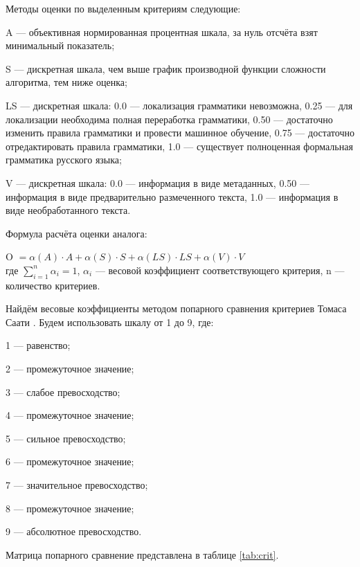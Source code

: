 Методы оценки по выделенным критериям следующие:
\begin{list}{}{\leftmargin=1.5cm}
	\item A --- объективная нормированная процентная шкала, за нуль отсчёта взят минимальный показатель;
	\item S --- дискретная шкала, чем выше график производной функции сложности алгоритма, тем ниже оценка;
	\item LS --- дискретная шкала: 0.0 --- локализация грамматики невозможна, 0.25 --- для локализации необходима полная переработка грамматики, 0.50 --- достаточно изменить правила грамматики и провести машинное обучение, 0.75 --- достаточно отредактировать правила грамматики, 1.0 --- существует полноценная формальная грамматика русского языка;
	\item V --- дискретная шкала: 0.0 --- информация в виде метаданных, 0.50 --- информация в виде предварительно размеченного текста, 1.0 --- информация в виде необработанного текста.
\end{list}

Формула расчёта оценки аналога:

O \(= \alpha(A) \cdot A + \alpha(S) \cdot S + \alpha(LS) \cdot LS + \alpha(V) \cdot V\)\\
где 
\(\sum_{i=1}^{n} \alpha_i = 1\), \(\alpha_i\) --- весовой коэффициент соответствующего критерия, n --- количество критериев.

Найдём весовые коэффициенты методом попарного сравнения критериев Томаса Саати \cite{tsaati}. 
Будем использовать шкалу от 1 до 9, где: 
\begin{list}{}{\leftmargin=1.5cm}
  \item 1 --- равенство;
  \item 2 --- промежуточное значение;
  \item 3 --- слабое превосходство;
  \item 4 --- промежуточное значение;
  \item 5 --- сильное превосходство;
  \item 6 --- промежуточное значение;
  \item 7 --- значительное превосходство;
  \item 8 --- промежуточное значение;
  \item 9 --- абсолютное превосходство.
\end{list}
Матрица попарного сравнение представлена в таблице \ref{tab:crit}.

